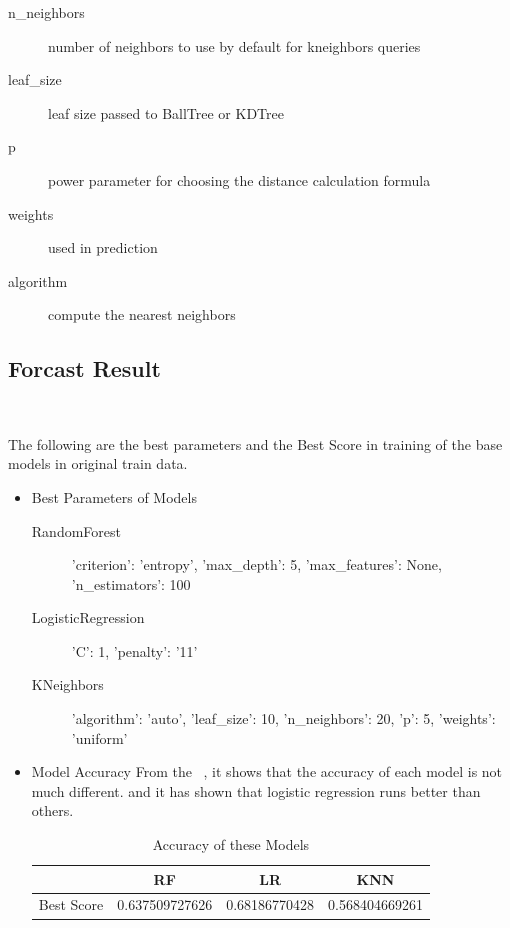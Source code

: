 \begin{description}
	\item[n_neighbors] number of neighbors to use 
	by default for kneighbors queries
	\item[leaf_size] leaf size passed to BallTree or KDTree
	\item[p] power parameter for choosing 
	the distance calculation formula
	\item[weights] used in prediction
	\item[algorithm] compute the nearest neighbors
\end{description}

	
\subsection{Forcast Result}

\

The following are the best parameters and 
the Best Score in training of 
the base models 
in original train data. 

\begin{itemize}
	\item Best Parameters of Models
	\begin{description}
		\item[RandomForest] 'criterion': 'entropy', 'max\_depth': 5, 
		'max\_features': None, 'n\_estimators': 100
		\item[LogisticRegression] 'C': 1, 'penalty': '11'
	
		\item[KNeighbors] 'algorithm': 'auto', 'leaf\_size': 10, 
		'n\_neighbors': 20, 'p': 5, 'weights': 'uniform'

	\end{description}
	
	
\item Model Accuracy 
\newline
From the  ~,
it shows that the accuracy of 
each model is not much different.
and  it has shown that logistic regression runs better than others.
	\begin{table}[h]  
		\centering
		\caption{Accuracy of these Models}
		\label{tbl:best_score_base_models_old}
		\begin{tabular}{cccc}
			\toprule
			& RF  & LR  & KNN \\
			\midrule
			Best Score & 0.637509727626  & 0.68186770428  & 0.568404669261\\
			\bottomrule
		\end{tabular}
	\end{table}


\end{itemize}






